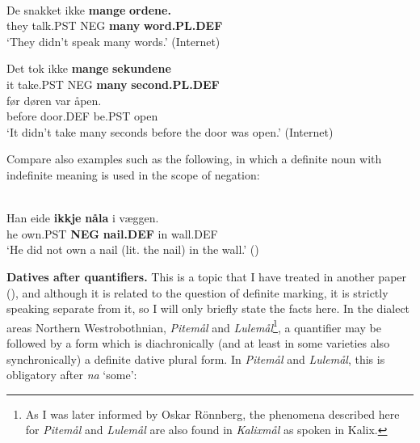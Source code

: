 
\ea\label{}
\\
\gll De  snakket  ikke   \textbf{mange} \textbf{  ordene.}\\ %
		they  talk.PST  NEG  \textbf{many} \textbf{word.PL.DEF}\\
\glt ‘They didn’t speak many words.’ (Internet)

\z

\ea
\gll Det  tok  ikke  \textbf{mange} \textbf{sekundene}\\ %
it  take.PST  NEG  \textbf{many} \textbf{second.PL.DEF}\\
\gll før  døren  var  åpen.\\
before  door.DEF  be.PST  open\\
\glt  ‘It didn’t take many seconds before the door was open.’ (Internet)

\z

Compare also examples such as the following, in which a definite noun with indefinite meaning is used in the scope of negation:


\ea \label{} 
\\
\gll Han  eide  \textbf{ikkje} \textbf{nåla} i  væggen.\\
he  own.PST  \textbf{NEG} \textbf{nail.DEF} in  wall.DEF\\
\glt ‘He did not own a nail (lit. the nail) in the wall.’ (\citet[18]{Iversen1918})

\z

\textbf{Datives after quantifiers. }This is a topic that I have treated in another paper (\citet{Dahl2008}), and although it is related to the question of definite marking, it is strictly speaking separate from it, so I will only briefly state the facts here. In the dialect areas Northern Westrobothnian, \textit{Pitemål} and \textit{Lulemål}\footnote{ As I was later informed by Oskar Rönnberg, the phenomena described here for \textit{Pitemål} and \textit{Lulemål} are also found in \textit{Kalixmål}\textit{ }as spoken in Kalix.}, a quantifier may be followed by a form which is diachronically (and at least in some varieties also synchronically) a definite dative plural form. In \textit{Pitemål} and \textit{Lulemål}, this is obligatory after \textit{na} ‘some’:

